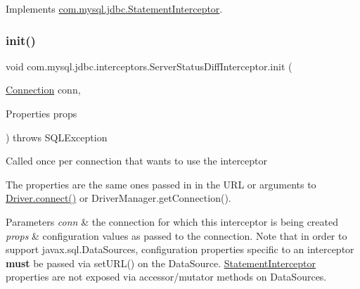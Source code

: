 Implements \mbox{\hyperlink{interfacecom_1_1mysql_1_1jdbc_1_1_statement_interceptor_a445950e1035a2519be9d5fbaf1fe1b8c}{com.\+mysql.\+jdbc.\+Statement\+Interceptor}}.

\mbox{\label{classcom_1_1mysql_1_1jdbc_1_1interceptors_1_1_server_status_diff_interceptor_a3d503667dd4d8f6dcaf6fbf4535bd5bf}} 
\subsubsection{\texorpdfstring{init()}{init()}}
{\footnotesize\ttfamily void com.\+mysql.\+jdbc.\+interceptors.\+Server\+Status\+Diff\+Interceptor.\+init (\begin{DoxyParamCaption}\item[{\mbox{\hyperlink{interfacecom_1_1mysql_1_1jdbc_1_1_connection}{Connection}}}]{conn,  }\item[{Properties}]{props }\end{DoxyParamCaption}) throws S\+Q\+L\+Exception}

Called once per connection that wants to use the interceptor

The properties are the same ones passed in in the U\+RL or arguments to \mbox{\hyperlink{classcom_1_1mysql_1_1jdbc_1_1_non_registering_driver_a834c012e752a01d1ee435b3461bb8218}{Driver.\+connect()}} or Driver\+Manager.\+get\+Connection().


\begin{DoxyParams}{Parameters}
{\em conn} & the connection for which this interceptor is being created \\
\hline
{\em props} & configuration values as passed to the connection. Note that in order to support javax.\+sql.\+Data\+Sources, configuration properties specific to an interceptor {\bfseries must} be passed via set\+U\+R\+L() on the Data\+Source. \mbox{\hyperlink{interfacecom_1_1mysql_1_1jdbc_1_1_statement_interceptor}{Statement\+Interceptor}} properties are not exposed via accessor/mutator methods on Data\+Sources.\\
\hline
\end{DoxyParams}


